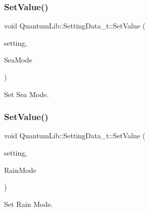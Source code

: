 \subsubsection{\texorpdfstring{Set\+Value()}{SetValue()}\hspace{0.1cm}{\footnotesize\ttfamily [15/26]}}
{\footnotesize\ttfamily void Quantum\+Lib\+::\+Setting\+Data\+\_\+t\+::\+Set\+Value (\begin{DoxyParamCaption}\item[{\mbox{\hyperlink{namespace_quantum_lib_acc8124e3e65bca4aa798d03a55e3d54c}{e\+Settings\+\_\+t}}}]{setting,  }\item[{\mbox{\hyperlink{namespace_quantum_lib_a66c359df4d1d3895303ab24910200c8d}{e\+Sea\+Mode\+\_\+t}}}]{Sea\+Mode }\end{DoxyParamCaption})\hspace{0.3cm}{\ttfamily [inline]}}



Set Sea Mode. 

\mbox{\label{struct_quantum_lib_1_1_setting_data__t_a942e5af26494a7865586b9b67b5941bb}} 
\subsubsection{\texorpdfstring{Set\+Value()}{SetValue()}\hspace{0.1cm}{\footnotesize\ttfamily [16/26]}}
{\footnotesize\ttfamily void Quantum\+Lib\+::\+Setting\+Data\+\_\+t\+::\+Set\+Value (\begin{DoxyParamCaption}\item[{\mbox{\hyperlink{namespace_quantum_lib_acc8124e3e65bca4aa798d03a55e3d54c}{e\+Settings\+\_\+t}}}]{setting,  }\item[{\mbox{\hyperlink{namespace_quantum_lib_a881f6940f59e1d22cecd947de841b245}{e\+Rain\+Mode\+\_\+t}}}]{Rain\+Mode }\end{DoxyParamCaption})\hspace{0.3cm}{\ttfamily [inline]}}



Set Rain Mode. 

\mbox{\label{struct_quantum_lib_1_1_setting_data__t_abad3d6c91619a27765fa8d1dad3ee352}} 

